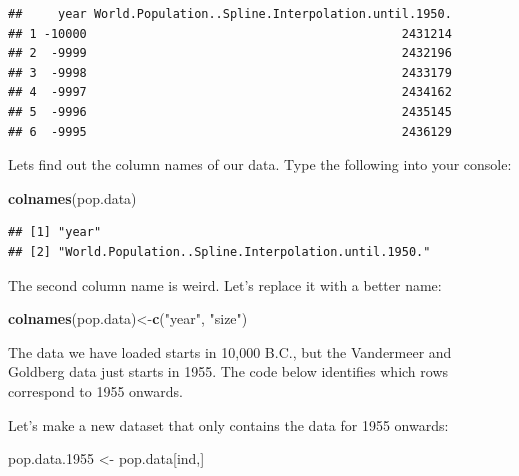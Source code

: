 \documentclass[]{book}
\newenvironment{Shaded}{\begin{snugshade}}{\end{snugshade}}
\newcommand{\KeywordTok}[1]{\textcolor[rgb]{0.13,0.29,0.53}{\textbf{{#1}}}}
\newcommand{\DecValTok}[1]{\textcolor[rgb]{0.00,0.00,0.81}{{#1}}}
\newcommand{\FloatTok}[1]{\textcolor[rgb]{0.00,0.00,0.81}{{#1}}}
\newcommand{\StringTok}[1]{\textcolor[rgb]{0.31,0.60,0.02}{{#1}}}
\newcommand{\NormalTok}[1]{{#1}}
\begin{document}
\begin{verbatim}
##     year World.Population..Spline.Interpolation.until.1950.
## 1 -10000                                            2431214
## 2  -9999                                            2432196
## 3  -9998                                            2433179
## 4  -9997                                            2434162
## 5  -9996                                            2435145
## 6  -9995                                            2436129
\end{verbatim}

Lets find out the column names of our data. Type the following into your
console:

\begin{Shaded}
\begin{Highlighting}[]
\KeywordTok{colnames}\NormalTok{(pop.data)}
\end{Highlighting}
\end{Shaded}

\begin{verbatim}
## [1] "year"                                              
## [2] "World.Population..Spline.Interpolation.until.1950."
\end{verbatim}

The second column name is weird. Let's replace it with a better name:

\begin{Shaded}
\begin{Highlighting}[]
\KeywordTok{colnames}\NormalTok{(pop.data)<-}\KeywordTok{c}\NormalTok{(}\StringTok{"year"}\NormalTok{, }\StringTok{"size"}\NormalTok{)}
\end{Highlighting}
\end{Shaded}

The data we have loaded starts in 10,000 B.C., but the Vandermeer and
Goldberg data just starts in 1955. The code below identifies which rows
correspond to 1955 onwards.

\begin{Shaded}
\end{Shaded}

Let's make a new dataset that only contains the data for 1955 onwards:

\begin{Shaded}
\begin{Highlighting}[]
\NormalTok{pop.data}\FloatTok{.1955} \NormalTok{<-}\StringTok{ }\NormalTok{pop.data[ind,]}
\end{Highlighting}
\end{Shaded}
\end{document}
